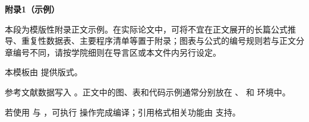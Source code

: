 
\clearpage
{}

{}

{\centering {} \bfseries \heiti 附录1（示例）\par}

\vspace{0.5cm}

 \songti
\setlength{\parindent}{2em}

本段为模版性附录正文示例。在实际论文中，可将不宜在正文展开的长篇公式推导、重复性数据表、主要程序清单等置于附录；图表与公式的编号规则若与正文分章编号不同，请按学院细则在导言区或本文件内另行设定。

本模板由  提供版式。

参考文献数据写入 。正文中的图、表和代码示例通常分别放在 、 和  环境中。

若使用  与 ，可执行  操作完成编译；引用格式相关功能由  支持。
